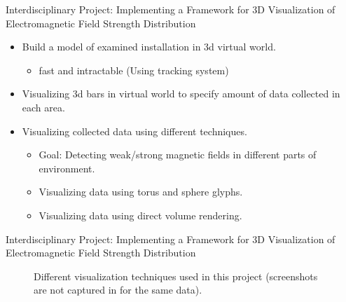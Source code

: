\documentclass{beamer}
\begin{document}
\begin{frame}{Interdisciplinary Project: Implementing a Framework for 3D Visualization of Electromagnetic Field Strength Distribution}
	\begin{itemize}
		\item Build a model of examined installation in 3d virtual world.
			\begin{itemize}
				\item fast and intractable (Using tracking system)
			\end{itemize}
		\item Visualizing 3d bars in virtual world to specify amount of data collected in each area.
		\item Visualizing collected data using different techniques.
			\begin{itemize}
				\item Goal: Detecting weak/strong magnetic fields in different parts of environment.
				\item Visualizing data using torus and sphere glyphs.
				\item Visualizing data using direct volume rendering.
			\end{itemize}
	\end{itemize}
\end{frame}

\begin{frame}{Interdisciplinary Project: Implementing a Framework for 3D Visualization of Electromagnetic Field Strength Distribution}
	\begin{figure}
		\centering
	\caption{Different visualization techniques used in this project (screenshots are not captured in for the same data).}
	\end{figure}
\end{frame}
\end{document}

